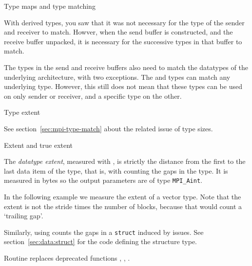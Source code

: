 
 {Type maps and type matching}

With derived types, you saw that it was not necessary for
the type of the sender and receiver to match.
Howver, when the send buffer is constructed,
and the receive buffer unpacked,
it is necessary for the successive types in that buffer to match.

The types in the send and receive buffers also need to match
the datatypes of the underlying architecture, with two exceptions.
The  and  types
can match any underlying type.
However, this still does not mean that these types can be used
on only sender or receiver, and a specific type on the other.

 {Type extent}
\label{sec:mpi-type-size}

See section~\ref{sec:mpi-type-match}
about the related issue of type sizes.

 {Extent and true extent}

The \emph{datatype extent},
measured with
,
is strictly the distance from the
first to the last data item of the type,
that is, with counting the gaps in the type.
It is measured in bytes so the output parameters are
of type \lstinline+MPI_Aint+.

In the following example we measure the extent of a vector type.
Note that the extent is not the stride times the number of blocks,
because that would count a `trailing gap'.
%

Similarly, using  counts the gaps
in a \lstinline{struct} induced by  issues.
%
%
See section~\ref{sec:data:struct} for the code defining the structure type.

\begin{remark}
  Routine 
  replaces
  deprecated functions ,
  , .
\end{remark}

